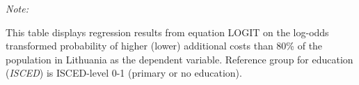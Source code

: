 \begin{table}[htbp!]
\begin{adjustbox}{width = 1\textwidth, max height = 0.95\textheight, center}
\begin{threeparttable}[b]
         \begin{tablenotes}\item \medskip \textit{Note:}
            \item This table displays regression results from equation LOGIT on the log-odds transformed probability of higher (lower) additional costs than 80\% of the population in Lithuania as the dependent variable. Reference group for education (\textit{ISCED}) is ISCED-level 0-1 (primary or no education).
         \end{tablenotes}
      \end{threeparttable}
   \end{adjustbox}
\end{table}


